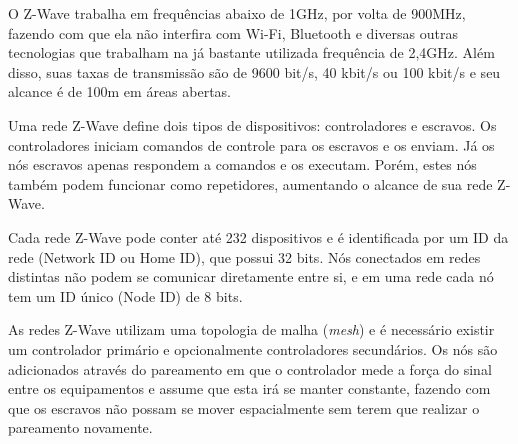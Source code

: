 O Z-Wave trabalha em frequências abaixo de 1GHz, por volta de 900MHz, fazendo com que ela não interfira com Wi-Fi, Bluetooth e diversas outras tecnologias que trabalham na já bastante utilizada frequência de 2,4GHz. Além disso, suas taxas de transmissão são de 9600 bit/s, 40 kbit/s ou 100 kbit/s e seu alcance é de 100m em áreas abertas.

Uma rede Z-Wave define dois tipos de dispositivos: controladores e escravos. Os controladores iniciam comandos de controle para os escravos e os enviam. Já os nós escravos apenas respondem a comandos e os executam. Porém, estes nós também podem funcionar como repetidores, aumentando o alcance de sua rede Z-Wave.

Cada rede Z-Wave pode conter até 232 dispositivos e é identificada por um ID da rede (Network ID ou Home ID), que possui 32 bits. Nós conectados em redes distintas não podem se comunicar diretamente entre si, e em uma rede cada nó tem um ID único (Node ID) de 8 bits.

As redes Z-Wave utilizam uma topologia de malha (\textit{mesh}) e é necessário existir um controlador primário e opcionalmente controladores secundários. Os nós são adicionados através do pareamento em que o controlador mede a força do sinal entre os equipamentos e assume que esta irá se manter constante, fazendo com que os escravos não possam se mover espacialmente sem terem que realizar o pareamento novamente.

